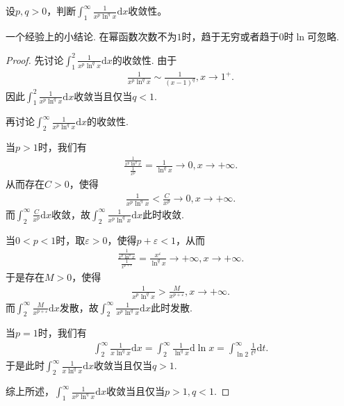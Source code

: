 \documentclass[../../main.tex]{subfiles}
\begin{document}
\begin{example}
设\(p,q > 0\)，判断\(\int_{1}^{\infty}\frac{1}{x^p\ln^q x}\mathrm{d}x\)收敛性。 
\end{example}
\begin{note}
一个经验上的小结论. 在幂函数次数不为\(1\)时，趋于无穷或者趋于\(0\)时\(\ln\)可忽略.
\end{note}
\begin{proof}
先讨论\(\int_{1}^{2}\frac{1}{x^p\ln ^q x}\mathrm{d}x\)的收敛性. 由于
\begin{align*}
\frac{1}{x^p\ln ^q x}\sim\frac{1}{(x - 1)^q},x\rightarrow 1^+.
\end{align*}
因此\(\int_{1}^{2}\frac{1}{x^p\ln ^q x}\mathrm{d}x\)收敛当且仅当\(q < 1\).

再讨论\(\int_{2}^{\infty}\frac{1}{x^p\ln ^q x}\mathrm{d}x\)的收敛性.

\one 当\(p > 1\)时，我们有
\begin{align*}
\frac{\frac{1}{x^p\ln ^q x}}{\frac{1}{x^p}}=\frac{1}{\ln ^q x}\rightarrow 0,x\rightarrow +\infty.
\end{align*}
从而存在\(C > 0\)，使得
\begin{align*}
\frac{1}{x^p\ln ^q x}<\frac{C}{x^p}\rightarrow 0,x\rightarrow +\infty.
\end{align*}
而\(\int_{2}^{\infty}\frac{C}{x^p}\mathrm{d}x\)收敛，故\(\int_{2}^{\infty}\frac{1}{x^p\ln ^q x}\mathrm{d}x\)此时收敛.

\two 当\(0 < p < 1\)时，取\(\varepsilon > 0\)，使得\(p + \varepsilon < 1\)，从而
\begin{align*}
\frac{\frac{1}{x^p\ln ^q x}}{\frac{1}{x^{p + \varepsilon}}}=\frac{x^{\varepsilon}}{\ln ^q x}\rightarrow +\infty,x\rightarrow +\infty.
\end{align*}
于是存在\(M > 0\)，使得
\begin{align*}
\frac{1}{x^p\ln ^q x}>\frac{M}{x^{p + \varepsilon}},x\rightarrow +\infty.
\end{align*}
而\(\int_{2}^{\infty}\frac{M}{x^{p + \varepsilon}}\mathrm{d}x\)发散，故\(\int_{2}^{\infty}\frac{1}{x^p\ln ^q x}\mathrm{d}x\)此时发散.

\three 当\(p = 1\)时，我们有
\begin{align*}
\int_{2}^{\infty}\frac{1}{x\ln ^q x}\mathrm{d}x=\int_{2}^{\infty}\frac{1}{\ln ^q x}\mathrm{d}\ln x=\int_{\ln 2}^{\infty}\frac{1}{t^q}\mathrm{d}t.
\end{align*}
于是此时\(\int_{2}^{\infty}\frac{1}{x\ln ^q x}\mathrm{d}x\)收敛当且仅当\(q > 1\).

综上所述，\(\int_{1}^{\infty}\frac{1}{x^p\ln ^q x}\mathrm{d}x\)收敛当且仅当\(p > 1,q < 1\). 
\end{proof}
\end{document}
